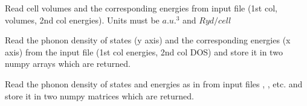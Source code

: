 \documentclass[letterpaper,10pt,english]{sphinxmanual}
\begin{document}

\begin{fulllineitems}
\label{pyqha:pyqha.read.read_EtotV}
Read cell volumes and the corresponding energies from input file 
(1st col, volumes, 2nd col energies). Units must be \(a.u.^3\) and 
\(Ryd/cell\)

\end{fulllineitems}


\begin{fulllineitems}
\label{pyqha:pyqha.read.read_alpha}
\end{fulllineitems}


\begin{fulllineitems}
\label{pyqha:pyqha.read.read_celldmt_hex}
\end{fulllineitems}


\begin{fulllineitems}
\label{pyqha:pyqha.read.read_dos}
Read the phonon density of states (y axis) and the corresponding energies (x axis)
from the input file  (1st col energies, 2nd col DOS) and store it
in two numpy arrays which are returned.

\end{fulllineitems}


\begin{fulllineitems}
\label{pyqha:pyqha.read.read_dos_geo}
Read the phonon density of states and energies as in {\hyperref[pyqha:pyqha.read.read_dos]{}} from  input files
, , etc. and store it in two numpy matrices which are returned.

\end{fulllineitems}
\end{document}
